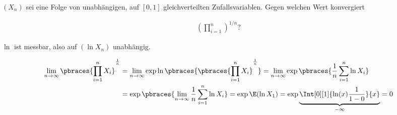 \begin{exercise}

$(X_n)$ sei eine Folge von unabhängigen, auf $[0, 1]$ gleichverteilten Zufallsvariablen. Gegen welchen Wert konvergiert

\begin{align*}
  (\prod_{i=1}^n)^{1/n}?
\end{align*}

\end{exercise}

\begin{solution}

$\ln$ ist messbar, also auf $(\ln X_n)$ unabhängig.

\begin{align*}
  \lim_{n \to \infty}
  \pbraces{\prod_{i=1}^n X_i}^\frac{1}{n}
  & =
  \lim_{n \to \infty}
  \exp \ln \pbraces{\pbraces{\prod_{i=1}^n X_i}^\frac{1}{n}}
  =
  \lim_{n \to \infty}
  \exp \pbraces{\frac{1}{n} \sum_{i=1}^n \ln X_i} \\
  & =
  \exp \pbraces
  {\lim_{n \to \infty} \frac{1}{n} \sum_{i=1}^n \ln X_i}
  =
  \exp \E(\ln X_1)
  =
  \exp \underbrace{\Int[0][1]{\ln(x) \frac{1}{1-0}}{x}}_{-\infty} = 0
\end{align*}

\end{solution}
